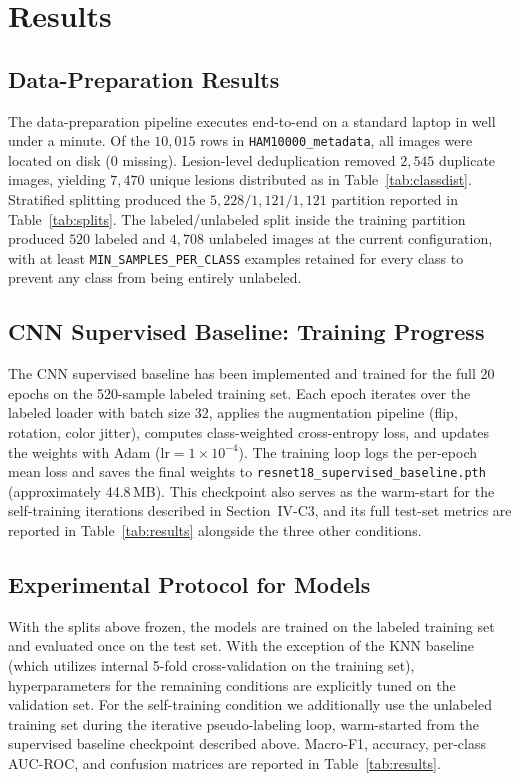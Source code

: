 \documentclass[conference]{IEEEtran}
\begin{document}
\section{Results}
\label{sec:results}

\subsection{Data-Preparation Results}
The data-preparation pipeline executes end-to-end on a standard
laptop in well under a minute. Of the $10{,}015$ rows in
\texttt{HAM10000\_metadata}, all images were located on disk
(0 missing). Lesion-level deduplication removed $2{,}545$ duplicate
images, yielding $7{,}470$ unique lesions distributed as in
Table~\ref{tab:classdist}. Stratified splitting produced the
$5{,}228 / 1{,}121 / 1{,}121$ partition reported in
Table~\ref{tab:splits}. The labeled/unlabeled split inside the
training partition produced $520$ labeled and $4{,}708$ unlabeled
images at the current configuration, with at least
\texttt{MIN\_SAMPLES\_PER\_CLASS} examples retained for every class
to prevent any class from being entirely unlabeled.

\subsection{CNN Supervised Baseline: Training Progress}
The CNN supervised baseline has been implemented and trained for the
full 20 epochs on the 520-sample labeled training set. Each epoch
iterates over the labeled loader with batch size 32, applies the
augmentation pipeline (flip, rotation, color jitter), computes
class-weighted cross-entropy loss, and updates the weights with
Adam ($\mathrm{lr} = 1 \times 10^{-4}$). The training loop logs the
per-epoch mean loss and saves the final weights to
\texttt{resnet18\_supervised\_baseline.pth} (approximately 44.8\,MB).
This checkpoint also serves as the warm-start for the self-training
iterations described in Section~IV-C3, and its full test-set metrics
are reported in Table~\ref{tab:results} alongside the three other
conditions.

\subsection{Experimental Protocol for Models}
With the splits above frozen, the models are trained on the 
labeled training set and evaluated once on the test set. 
With the exception of the KNN baseline (which utilizes internal 
5-fold cross-validation on the training set), hyperparameters for the 
remaining conditions are explicitly tuned on the validation set. For the self-training
condition we additionally use the unlabeled training set during the
iterative pseudo-labeling loop, warm-started from the supervised
baseline checkpoint described above. Macro-F1, accuracy, per-class
AUC-ROC, and confusion matrices are reported in Table~\ref{tab:results}.
\end{document}

